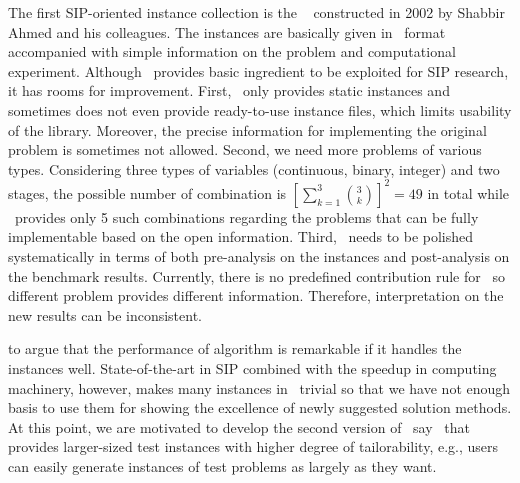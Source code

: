 The first SIP-oriented instance collection is the \siplib\ \cite{web:SIPLIB1} constructed in 
2002 by Shabbir Ahmed and his colleagues. The instances are basically given in \smps\ format 
accompanied with simple information on the problem and computational experiment. Although 
\siplib\ provides basic ingredient to be exploited for SIP research, it has rooms for 
improvement. First, \siplib\ only provides static instances and sometimes does not even 
provide ready-to-use instance files, which limits usability of the library. Moreover, the 
precise information for implementing the original problem is sometimes not allowed. Second, 
we need more problems of various types. Considering three types of variables (continuous, 
binary, integer) and two stages, the possible number of combination is $\left[\sum_{k=1}
^3\binom{3}{k}\right]^2=49$ in total while \siplib\ provides only 5 such combinations 
regarding the problems that can be fully implementable based on the open information.
Third, \siplib\ needs to be polished systematically in terms of both pre-analysis on the 
instances and post-analysis on the benchmark results. Currently, there is no predefined 
contribution rule for \siplib\ so different problem provides different information. 
Therefore, interpretation on the new results can be inconsistent.


to argue that the performance of algorithm is remarkable if it handles the instances well. 
State-of-the-art in SIP combined with the speedup in computing machinery, however, makes many 
instances in \siplib\ trivial so that we have not enough basis to use them for showing the 
excellence of newly suggested solution methods. At this point, we are motivated to develop 
the second version of \siplib\, say \siplibtwo\ that provides larger-sized test instances 
with higher degree of tailorability, e.g., users can easily generate instances of test 
problems as largely as they want.%

